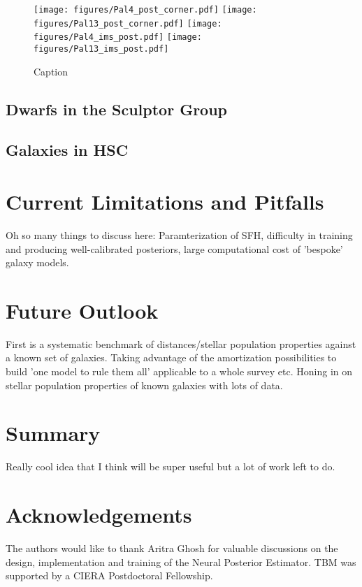 \documentclass[twocolumn]{aastex631}
\begin{document}
\begin{figure*}
    \centering
    \texttt{[image: figures/Pal4\_post\_corner.pdf]}
    \texttt{[image: figures/Pal13\_post\_corner.pdf]}
    \texttt{[image: figures/Pal4\_ims\_post.pdf]}
    \hspace{1cm}
    \texttt{[image: figures/Pal13\_ims\_post.pdf]}
    \caption{Caption}
    \label{fig:Pal4}
\end{figure*}


\subsection{Dwarfs in the Sculptor Group}
\label{sec:scul}
\subsection{Galaxies in HSC}
\label{sec:hsc}

\section{Current Limitations and Pitfalls}
\label{sec:issues}
Oh so many things to discuss here: Paramterization of SFH, difficulty in training and producing well-calibrated posteriors, large computational cost of 'bespoke' galaxy models.

\section{Future Outlook}
\label{sec:future}
First is a systematic benchmark of distances/stellar population properties against a known set of galaxies. Taking advantage of the amortization possibilities to build 'one model to rule them all' applicable to a whole survey etc. Honing in on stellar population properties of known galaxies with lots of data.

\section{Summary}
\label{sec:summary}
Really cool idea that I think will be super useful but a lot of work left to do.

\section*{Acknowledgements}
The authors would like to thank Aritra Ghosh for valuable discussions on the design, implementation and training of the Neural Posterior Estimator. TBM was supported by a CIERA Postdoctoral Fellowship.
\end{document}
